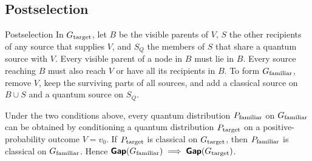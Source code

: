 \subsection{Postselection}\label{sec:postselection}
\begin{piggyback}{Postselection}
In \(G_{\text{target}}\), let \(B\) be the visible parents of \(V\), \(S\) the other
recipients of any source that supplies \(V\), and \(S_Q\) the members of
\(S\) that share a quantum source with \(V\). Every visible parent of a
node in \(B\) must lie in \(B\). Every source reaching \(B\) must also reach
\(V\) or have all its recipients in \(B\). To form \(G_{\text{familiar}}\), remove
\(V\), keep the surviving parts of all sources, and add a classical source
on \(B\cup S\) and a quantum source on \(S_Q\).
\end{piggyback}
\begin{proposition}\label{prop:postselection}
Under the two conditions above, every quantum distribution \(P_{\text{familiar}}\)
on \(G_{\text{familiar}}\) can be obtained by conditioning a quantum distribution
\(P_{\text{target}}\) on a positive-probability outcome \(V=v_0\). If \(P_{\text{target}}\)
is classical on \(G_{\text{target}}\), then \(P_{\text{familiar}}\) is classical on
\(G_{\text{familiar}}\). Hence \(\operatorname{\text{\normalfont\sffamily\bfseries Gap}}(G_{\text{familiar}})\implies\operatorname{\text{\normalfont\sffamily\bfseries Gap}}(G_{\text{target}})\).
\end{proposition}
